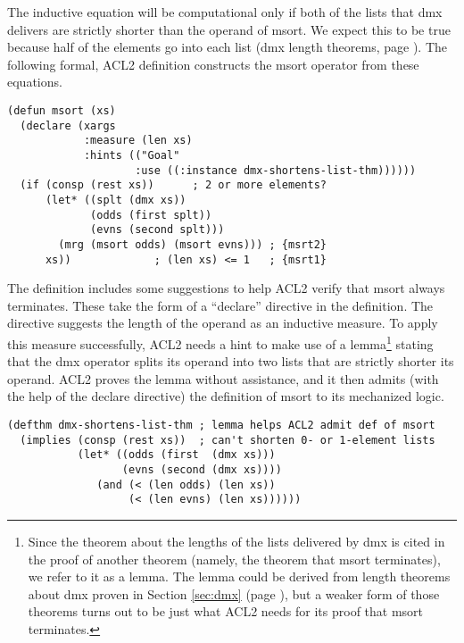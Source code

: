 The inductive equation will be computational only if
both of the lists that dmx delivers are strictly
shorter than the operand of msort.
We expect this to be true because half
of the elements go into each list
(dmx length theorems, page \pageref{thm:dmx-length-first-second}).
The following formal, ACL2 definition constructs the msort operator
from these equations.

\label{defun:msort}\label{eq:msrt1}
\begin{Verbatim}
(defun msort (xs)
  (declare (xargs
            :measure (len xs)
            :hints (("Goal"
                    :use ((:instance dmx-shortens-list-thm))))))
  (if (consp (rest xs))      ; 2 or more elements?
      (let* ((splt (dmx xs))
             (odds (first splt))
             (evns (second splt)))
        (mrg (msort odds) (msort evns))) ; {msrt2}
      xs))             ; (len xs) <= 1   ; {msrt1}
\end{Verbatim}

The definition includes some suggestions
to help ACL2 verify that msort always terminates.
These take the form of a ``declare'' directive
in the definition.
The directive suggests the length of the operand as an inductive measure.
To apply this measure successfully,
ACL2 needs a hint to make use of a lemma\footnote{Since
the theorem about the lengths of the lists
delivered by dmx is cited in the proof of
another theorem (namely, the theorem that msort terminates),
we refer to it as a lemma.
The lemma could be derived from length theorems about dmx
proven in Section \ref{sec:dmx} (page \pageref{thm:dmx-length-first-second}),
but a weaker form of those theorems turns out to be just what
ACL2 needs for its proof that msort terminates.}
stating that the dmx operator splits its
operand into two lists that are strictly shorter its operand.
ACL2 proves the lemma without assistance,
and it then admits (with the help of the declare directive)
the definition of msort to its mechanized logic.

\label{defthm:dmx-shortens-list}
\begin{Verbatim}
(defthm dmx-shortens-list-thm ; lemma helps ACL2 admit def of msort
  (implies (consp (rest xs))  ; can't shorten 0- or 1-element lists
           (let* ((odds (first  (dmx xs)))
                  (evns (second (dmx xs))))
              (and (< (len odds) (len xs))
                   (< (len evns) (len xs))))))
\end{Verbatim}

